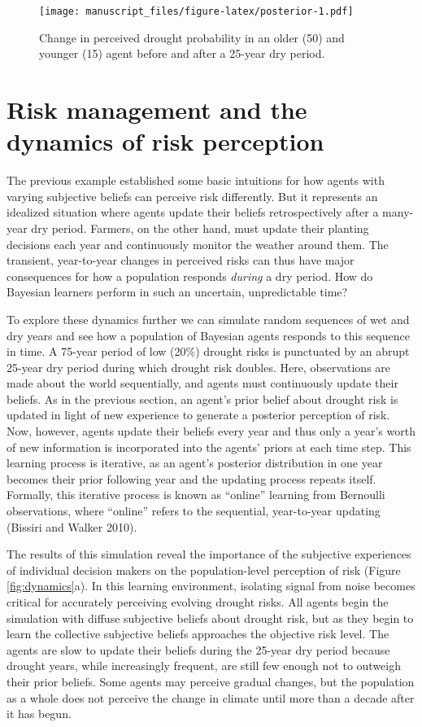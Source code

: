 \documentclass[smallextended]{svjour3}       %
\begin{document}
\begin{figure}
\centering
\texttt{[image: manuscript\_files/figure-latex/posterior-1.pdf]}
\caption{\label{fig:posterior}Change in perceived drought probability in an older (50) and younger (15) agent before and after a 25-year dry period.}
\end{figure}

\hypertarget{sec:4}{%
\section{Risk management and the dynamics of risk perception}\label{sec:4}}

The previous example established some basic intuitions for how agents with varying subjective beliefs can perceive risk differently. But it represents an idealized situation where agents update their beliefs retrospectively after a many-year dry period. Farmers, on the other hand, must update their planting decisions each year and continuously monitor the weather around them. The transient, year-to-year changes in perceived risks can thus have major consequences for how a population responds \emph{during} a dry period. How do Bayesian learners perform in such an uncertain, unpredictable time?

To explore these dynamics further we can simulate random sequences of wet and dry years and see how a population of Bayesian agents responds to this sequence in time. A 75-year period of low (20\%) drought risks is punctuated by an abrupt 25-year dry period during which drought risk doubles. Here, observations are made about the world sequentially, and agents must continuously update their beliefs. As in the previous section, an agent's prior belief about drought risk is updated in light of new experience to generate a posterior perception of risk. Now, however, agents update their beliefs every year and thus only a year's worth of new information is incorporated into the agents' priors at each time step. This learning process is iterative, as an agent's posterior distribution in one year becomes their prior following year and the updating process repeats itself. Formally, this iterative process is known as ``online'' learning from Bernoulli observations, where ``online'' refers to the sequential, year-to-year updating (Bissiri and Walker 2010).

The results of this simulation reveal the importance of the subjective experiences of individual decision makers on the population-level perception of risk (Figure \ref{fig:dynamics}a). In this learning environment, isolating signal from noise becomes critical for accurately perceiving evolving drought risks. All agents begin the simulation with diffuse subjective beliefs about drought risk, but as they begin to learn the collective subjective beliefs approaches the objective risk level. The agents are slow to update their beliefs during the 25-year dry period because drought years, while increasingly frequent, are still few enough not to outweigh their prior beliefs. Some agents may perceive gradual changes, but the population as a whole does not perceive the change in climate until more than a decade after it has begun.
\end{document}
